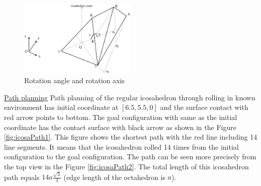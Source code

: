 \begin{figure}[h]
\centering
	\includegraphics[width=0.5\textwidth]{image/icosaGeo55.png}
	\caption{Rotation angle and rotation axis}
	\label{fig:icosaGeo5}
\end{figure}

%
%
\noindent\uline{Path planning} 
Path planning of the regular icosahedron through rolling in known environment has initial coordinate at $[6.5, 5.5, 0]$ and the surface contact with red arrow points to bottom. The goal configuration with same as the initial coordinate has the contact surface with black arrow as shown in the Figure \ref{fig:icosaPath1}. This figure shows the shortest path with the red line including 14 line segments. It means that the icosahedron rolled 14 times from the initial configuration to the goal configuration. The path can be seen more precisely from the top view in the Figure \ref{fig:icosaPath2}.
The total length of this icosahedron path equals $14a\frac{\sqrt{3}}{3}$ (edge length of the octahedron is $a$).

